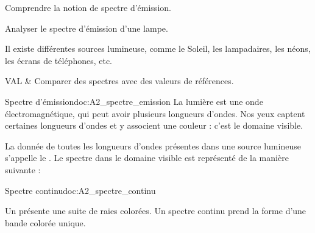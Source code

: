 \teteSndLumi

\vspace*{-36pt}


\begin{objectifs}
  \item Comprendre la notion de spectre d'émission.
  \item Analyser le spectre d'émission d'une lampe.
\end{objectifs}

\begin{contexte}
  Il existe différentes sources lumineuse, comme le Soleil, les lampadaires, les néons, les écrans de téléphones, etc.
  
\end{contexte}


\begin{tableauCompetences}
  VAL & Comparer des spectres avec des valeurs de références. \\
\end{tableauCompetences}


\begin{doc}{Spectre d'émission}{doc:A2_spectre_emission}
  La lumière est une onde électromagnétique, qui peut avoir plusieurs longueurs d'ondes.
  Nos yeux captent certaines longueurs d'ondes et y associent une couleur : c'est le domaine visible.
  
  \begin{importants}
    La donnée de toutes les longueurs d'ondes présentes dans une source lumineuse s'appelle le .
    Le spectre dans le domaine visible est représenté de la manière suivante :
  \end{importants}
  
  \begin{center}
  \end{center}
\end{doc}



\begin{doc}{Spectre continu}{doc:A2_spectre_continu}
  \begin{importants}
    Un  présente une suite de raies colorées.
    Un spectre continu prend la forme d'une bande colorée unique.
  \end{importants}
\end{doc}

